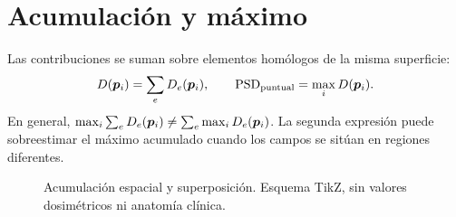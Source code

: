 \Needspace{12cm}
\section{Acumulación y máximo}
Las contribuciones se suman sobre elementos homólogos de la misma superficie:
\begin{equation}
D(\bm{p}_i)=\sum_e D_e(\bm{p}_i),\qquad
\mathrm{PSD}_{\mathrm{puntual}}=\max_i D(\bm{p}_i).
\end{equation}
En general, $\max_i\sum_eD_e(\bm{p}_i)\neq\sum_e\max_iD_e(\bm{p}_i)$. La segunda expresión puede sobreestimar el máximo acumulado cuando los campos se sitúan en regiones diferentes.
\begin{figure}[H]\centering
\caption{Acumulación espacial y superposición. Esquema TikZ, sin valores dosimétricos ni anatomía clínica.}\end{figure}
\FloatBarrier
